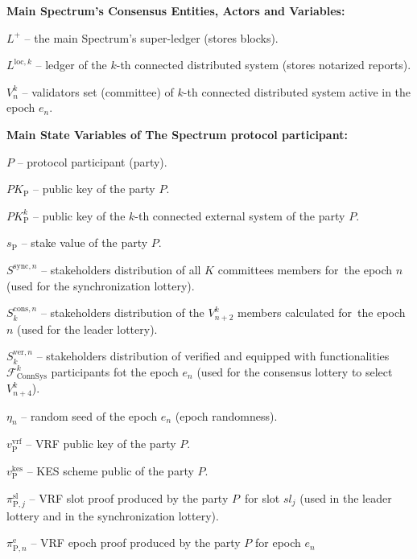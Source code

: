 \noindent
\textbf{Main Spectrum's Consensus Entities, Actors and Variables:}
\begin{legal}
    \item[\ding{113}] $L^+$ -- the main Spectrum's super-ledger (stores blocks).
    \item[\ding{113}] $L^{\text{loc}, k}$ -- ledger of the $k$-th connected distributed system (stores notarized reports).
    \item[\ding{113}] $V^k_n$ -- validators set (committee) of $k$-th connected distributed system active in the epoch $e_n$.
\end{legal}
\bigbreak

\noindent
\textbf{Main State Variables of The Spectrum protocol participant:}
\begin{legal}
    \item[\ding{113}] $P$ -- protocol participant (party).
    \item[\ding{113}] $PK_{\text{P}}$ -- public key of the party $P$.
    \item[\ding{113}] $PK^k_{\text{P}}$ -- public key of the $k$-th connected external system of the party $P$.
    \item[\ding{113}] $s_{\text{P}}$ -- stake value of the party $P$.
    \item[\ding{113}] $S^{\text{sync}, n}$ -- stakeholders distribution of all $K$ committees members for\
    the epoch $n$ (used for the synchronization lottery).
    \item[\ding{113}] $S_k^{\text{cons}, n}$ -- stakeholders distribution of the $V^k_{n + 2}$ members calculated for\
    the epoch $n$ (used for the leader lottery).
    \item[\ding{113}] $S_k^{\text{ver}, n}$ -- stakeholders distribution of verified and equipped with functionalities\
    $\mathcal{F}^k_{\text{ConnSys}}$ participants fot the epoch $e_n$ (used for the consensus lottery to select $V^k_{n + 4}$).
    \item[\ding{113}] $\eta_n$ -- random seed of the epoch $e_n$ (epoch randomness).
    \item[\ding{113}] $v^{\text{vrf}}_{\text{P}}$ -- VRF public key of the party $P$.
    \item[\ding{113}] $v^{\text{kes}}_{\text{P}}$ -- KES scheme public of the party $P$.
    \item[\ding{113}] $\pi^{\text{sl}}_{\text{P}, j}$ -- VRF slot proof produced by the party $P$\
    for slot $sl_j$ (used in the leader lottery and in the synchronization lottery).
    \item[\ding{113}] $\pi^{\text{e}}_{\text{P}, n}$ -- VRF epoch proof produced by the party $P$ for epoch $e_n$\

\end{legal}
